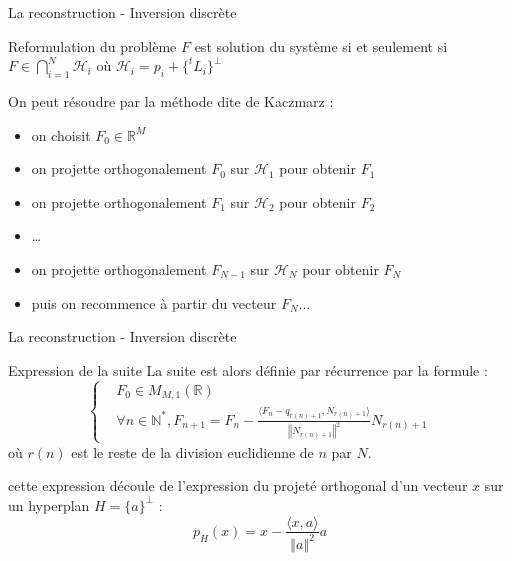 \documentclass{beamer}
\newcommand*{\N}{\mathbb{N}}
\newcommand*{\R}{\mathbb{R}}
\newcommand*{\scal}[2]{\langle #1, #2 \rangle}
\newcommand*{\norme}[1]{\left \Vert #1 \right \Vert}
\begin{document}
\begin{frame}{La reconstruction - Inversion discrète}
    \begin{beamerboxesrounded}{Reformulation du problème}
        $F$ est solution du système si et seulement si $F \in \bigcap_{i =1}^N \mathcal{H}_i$ où $\mathcal{H}_i = p_i + \{^t L_i\}^{\perp}$
    \end{beamerboxesrounded}
    On peut résoudre par la méthode dite de Kaczmarz : 
    \begin{itemize}
        \item on choisit $F_0 \in \R^M$
        \pause
        \item on projette orthogonalement $F_0$ sur $\mathcal{H}_1$ pour obtenir $F_1$
        \pause
        \item on projette orthogonalement $F_1$ sur $\mathcal{H}_2$ pour obtenir $F_2$
        \item \dots
        \pause
        \item on projette orthogonalement $F_{N-1}$ sur $\mathcal{H}_N$ pour obtenir $F_N$
        \pause
        \item puis on recommence à partir du vecteur $F_N \dots$
    \end{itemize}
\end{frame}

\begin{frame}{La reconstruction - Inversion discrète}
    \begin{beamerboxesrounded}{Expression de la suite}
        La suite est alors définie par récurrence par la formule : 
        $$\left\{ 
        \begin{array}{ll}
            & F_0 \in M_{M,1}(\R)\\
            & \forall n \in \N^{*}, F_{n+1}= F_n - \frac{\scal{F_n - q_{r(n)+1}}{N_{r(n)+1}}}{\norme{N_{r(n)+1}}^2}N_{r(n)+1}  
        \end{array}\right.$$
        où $r(n)$ est le reste de la division euclidienne de $n$ par $N$. 
    \end{beamerboxesrounded}
cette expression découle de l'expression du projeté orthogonal d'un vecteur $x$ sur un hyperplan $H = \{a\}^{\perp}$ : 
$$p_H(x) = x - \frac{\scal{x}{a}}{\norme{a}^2}a $$
\end{frame}
\end{document}

